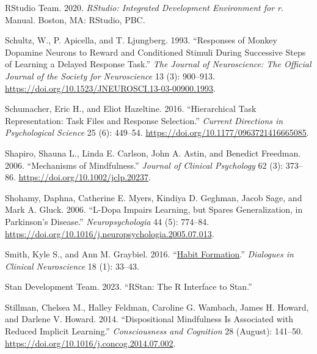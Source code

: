 \documentclass{article}
\newlength{\cslhangindent}
\newlength{\cslentryspacingunit} %
\newenvironment{CSLReferences}[2] %
 {%
  \setlength{\parindent}{0pt}
  \ifodd #1
  \let\oldpar\par
  \def\par{\hangindent=\cslhangindent\oldpar}
  \fi
  \setlength{\parskip}{#2\cslentryspacingunit}
 }%
 {}
\begin{document}
\begin{CSLReferences}{1}{0}
\leavevmode{}%
RStudio Team. 2020. \emph{{RStudio}: {Integrated} Development
Environment for r}. Manual. {Boston, MA}: {RStudio, PBC.}

\leavevmode{}%
Schultz, W., P. Apicella, and T. Ljungberg. 1993. {``Responses of Monkey
Dopamine Neurons to Reward and Conditioned Stimuli During Successive
Steps of Learning a Delayed Response Task.''} \emph{The Journal of
Neuroscience: The Official Journal of the Society for Neuroscience} 13
(3): 900--913. \url{https://doi.org/10.1523/JNEUROSCI.13-03-00900.1993}.

\leavevmode{}%
Schumacher, Eric H., and Eliot Hazeltine. 2016. {``Hierarchical {Task
Representation}: {Task Files} and {Response Selection}.''} \emph{Current
Directions in Psychological Science} 25 (6): 449--54.
\url{https://doi.org/10.1177/0963721416665085}.

\leavevmode{}%
Shapiro, Shauna L., Linda E. Carlson, John A. Astin, and Benedict
Freedman. 2006. {``Mechanisms of Mindfulness.''} \emph{Journal of
Clinical Psychology} 62 (3): 373--86.
\url{https://doi.org/10.1002/jclp.20237}.

\leavevmode{}%
Shohamy, Daphna, Catherine E. Myers, Kindiya D. Geghman, Jacob Sage, and
Mark A. Gluck. 2006. {``L-Dopa Impairs Learning, but Spares
Generalization, in {Parkinson}'s Disease.''} \emph{Neuropsychologia} 44
(5): 774--84.
\url{https://doi.org/10.1016/j.neuropsychologia.2005.07.013}.

\leavevmode{}%
Smith, Kyle S., and Ann M. Graybiel. 2016.
{``\href{https://www.ncbi.nlm.nih.gov/pmc/articles/PMC4826769}{Habit
Formation}.''} \emph{Dialogues in Clinical Neuroscience} 18 (1): 33--43.

\leavevmode{}%
Stan Development Team. 2023. {``{RStan}: The {R} Interface to {Stan}.''}

\leavevmode{}%
Stillman, Chelsea M., Halley Feldman, Caroline G. Wambach, James H.
Howard, and Darlene V. Howard. 2014. {``Dispositional Mindfulness Is
Associated with Reduced Implicit Learning.''} \emph{Consciousness and
Cognition} 28 (August): 141--50.
\url{https://doi.org/10.1016/j.concog.2014.07.002}.


\end{CSLReferences}
\end{document}
